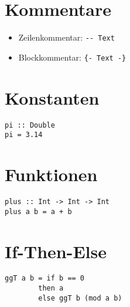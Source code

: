 \documentclass[
  10pt,                   %
  DIV12,
  german,                 %
  oneside,                %
  parskip=half,           %
  headings=normal,        %
  captions=tableheading,  %
]{scrartcl}
\begin{document}
\section{Kommentare}
\begin{itemize}
\item Zeilenkommentar: \lstinline|-- Text| 
\item Blockkommentar: \lstinline|{- Text -}|
\end{itemize}

\section{Konstanten}
\begin{minipage}[hbt]{6cm}
\centering
\begin{lstlisting}
pi :: Double
pi = 3.14
\end{lstlisting}
\end{minipage}
\hfill
\begin{minipage}[hbt]{8cm}
\centering
\scalebox{0.7}{}
\end{minipage}

\section{Funktionen}
\begin{minipage}[hbt]{6cm}
\centering
\begin{lstlisting}
plus :: Int -> Int -> Int
plus a b = a + b
\end{lstlisting}
\end{minipage}
\hfill
\begin{minipage}[hbt]{8cm}
\centering
\scalebox{0.6}{}
\end{minipage}

\section{If-Then-Else}
\begin{minipage}[hbt]{6cm}
\centering
\begin{lstlisting}
ggT a b = if b == 0 
        then a 
        else ggT b (mod a b)
\end{lstlisting}
\end{minipage}
\hfill
\begin{minipage}[hbt]{8cm}
\centering
\scalebox{0.7}{}
\end{minipage}
\end{document}
